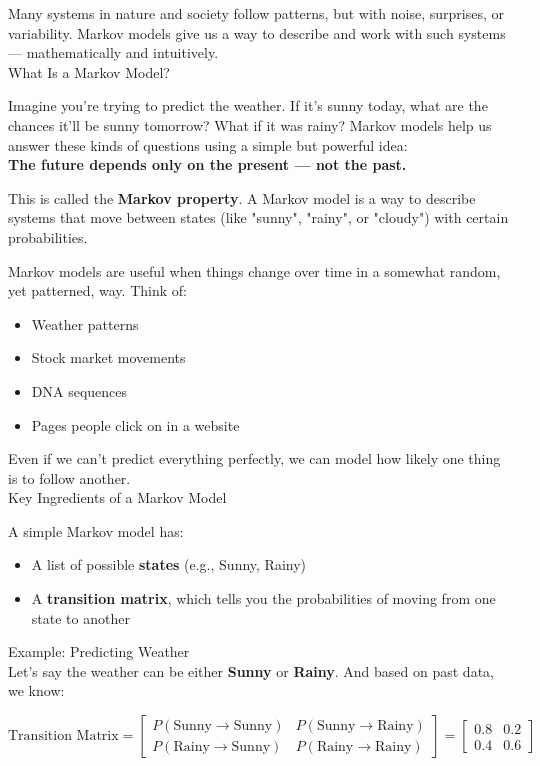 \documentclass{book}
\begin{document}
Many systems in nature and society follow patterns, but with noise, surprises, or variability. Markov models give us a way to describe and work with such systems — mathematically and intuitively.\\

What Is a Markov Model?

Imagine you're trying to predict the weather. If it’s sunny today, what are the chances it’ll be sunny tomorrow? What if it was rainy? Markov models help us answer these kinds of questions using a simple but powerful idea:\\

\textbf{The future depends only on the present — not the past.}

This is called the \textbf{Markov property}. A Markov model is a way to describe systems that move between states (like "sunny", "rainy", or "cloudy") with certain probabilities.

Markov models are useful when things change over time in a somewhat random, yet patterned, way. Think of:

\begin{itemize}
  \item Weather patterns
  \item Stock market movements
  \item DNA sequences
  \item Pages people click on in a website
\end{itemize}

Even if we can’t predict everything perfectly, we can model how likely one thing is to follow another.\\

Key Ingredients of a Markov Model

A simple Markov model has:
\begin{itemize}
  \item A list of possible \textbf{states} (e.g., Sunny, Rainy)
  \item A \textbf{transition matrix}, which tells you the probabilities of moving from one state to another
\end{itemize}

Example: Predicting Weather\\

Let’s say the weather can be either \textbf{Sunny} or \textbf{Rainy}. And based on past data, we know:

\[
\text{Transition Matrix} =
\begin{bmatrix}
P(\text{Sunny} \rightarrow \text{Sunny}) & P(\text{Sunny} \rightarrow \text{Rainy}) \\
P(\text{Rainy} \rightarrow \text{Sunny}) & P(\text{Rainy} \rightarrow \text{Rainy})
\end{bmatrix}
=
\begin{bmatrix}
0.8 & 0.2 \\
0.4 & 0.6
\end{bmatrix}
\]
\end{document}
